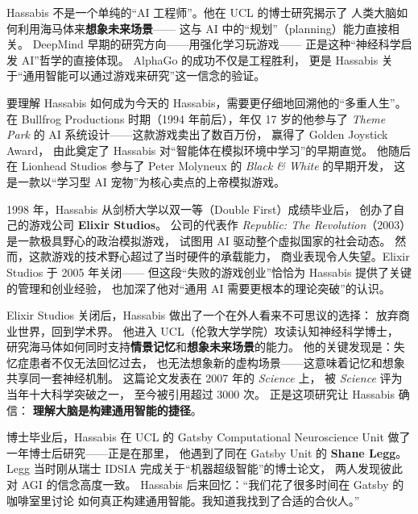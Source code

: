 \begin{whybox}
Hassabis 不是一个单纯的``AI 工程师''。他在 UCL 的博士研究揭示了
人类大脑如何利用海马体来\textbf{想象未来场景}——
这与 AI 中的``规划''（planning）能力直接相关。
DeepMind 早期的研究方向——用强化学习玩游戏——
正是这种``神经科学启发 AI''哲学的直接体现。
AlphaGo 的成功不仅是工程胜利，
更是 Hassabis 关于``通用智能可以通过游戏来研究''这一信念的验证。
\end{whybox}

要理解 Hassabis 如何成为今天的 Hassabis，需要更仔细地回溯他的``多重人生''。
在 Bullfrog Productions 时期（1994 年前后），年仅 17 岁的他参与了
\textit{Theme Park} 的 AI 系统设计——这款游戏卖出了数百万份，
赢得了 Golden Joystick Award，
由此奠定了 Hassabis 对``智能体在模拟环境中学习''的早期直觉。
他随后在 Lionhead Studios 参与了 Peter Molyneux 的 \textit{Black \& White} 的早期开发，
这是一款以``学习型 AI 宠物''为核心卖点的上帝模拟游戏。

1998 年，Hassabis 从剑桥大学以双一等（Double First）成绩毕业后，
创办了自己的游戏公司 \textbf{Elixir Studios}。
公司的代表作 \textit{Republic: The Revolution}（2003）是一款极具野心的政治模拟游戏，
试图用 AI 驱动整个虚拟国家的社会动态。
然而，这款游戏的技术野心超过了当时硬件的承载能力，
商业表现令人失望。Elixir Studios 于 2005 年关闭——
但这段``失败的游戏创业''恰恰为 Hassabis 提供了关键的管理和创业经验，
也加深了他对``通用 AI 需要更根本的理论突破''的认识。

\begin{corebox}
Elixir Studios 关闭后，Hassabis 做出了一个在外人看来不可思议的选择：
放弃商业世界，回到学术界。
他进入 UCL（伦敦大学学院）攻读认知神经科学博士，
研究海马体如何同时支持\textbf{情景记忆}和\textbf{想象未来场景}的能力。
他的关键发现是：失忆症患者不仅无法回忆过去，
也无法想象新的虚构场景——这意味着记忆和想象共享同一套神经机制。
这篇论文发表在 2007 年的 \textit{Science} 上，
被 \textit{Science} 评为当年十大科学突破之一，
至今被引用超过 3000 次。
正是这项研究让 Hassabis 确信：
\textbf{理解大脑是构建通用智能的捷径}。
\end{corebox}

博士毕业后，Hassabis 在 UCL 的 Gatsby Computational Neuroscience Unit
做了一年博士后研究——正是在那里，
他遇到了同在 Gatsby Unit 的 \textbf{Shane Legg}。
Legg 当时刚从瑞士 IDSIA 完成关于``机器超级智能''的博士论文，
两人发现彼此对 AGI 的信念高度一致。
Hassabis 后来回忆：``我们花了很多时间在 Gatsby 的咖啡室里讨论
如何真正构建通用智能。我知道我找到了合适的合伙人。''

